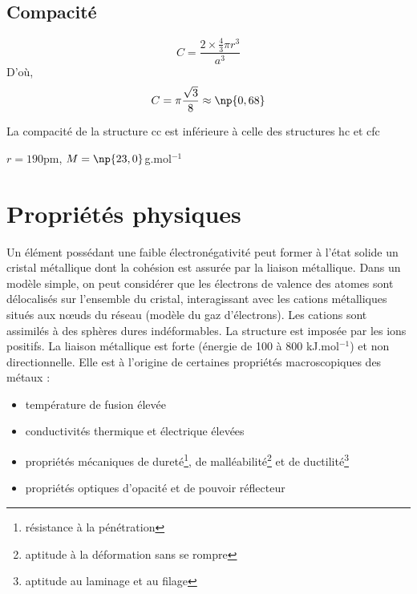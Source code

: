 \subsection{Compacité}
\begin{equation*}
    C = \frac{2\times \frac{4}{3} \pi r^3}{a^3}
\end{equation*}
D'où,
\begin{equation}
    C = \pi \frac{\sqrt{3}}{8} \approx \np{0,68}
\end{equation}
\begin{rem}
    La compacité de la structure cc est inférieure à celle
    des structures hc et cfc
\end{rem}
\begin{ex}[Na]
    $r = 190$pm, $M = \np{23,0}$g.mol$^{-1}$
\end{ex}

\section{Propriétés physiques}
Un élément possédant une faible électronégativité peut former
à l’état solide un cristal métallique dont la cohésion est
assurée par la liaison métallique.
Dans un modèle simple, on peut considérer que les électrons
de valence des atomes sont délocalisés sur l’ensemble du
cristal, interagissant avec les cations métalliques situés
aux n\oe uds du réseau (modèle du gaz d’électrons).
Les cations sont assimilés à des sphères dures
indéformables. La structure est imposée par les ions positifs.
La liaison métallique est forte (énergie de 100 à 800 kJ.mol$^{-1}$)
et non directionnelle. Elle est à l’origine de certaines
propriétés macroscopiques des métaux :
\begin{itemize}
    \item température de fusion élevée 
    \item conductivités thermique et électrique élevées
    \item propriétés mécaniques de dureté\footnote{résistance à
        la pénétration}, de malléabilité\footnote{aptitude à la
        déformation sans se rompre} et de
        ductilité\footnote{aptitude au laminage et au filage}
    \item propriétés optiques d'opacité et de pouvoir réflecteur
\end{itemize}

